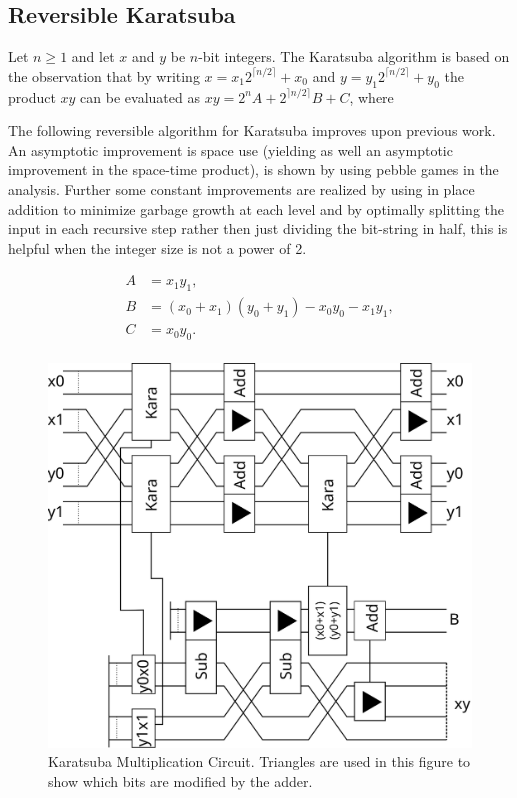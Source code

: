   \subsection{Reversible Karatsuba\label{sec:kara}}    
    Let $n\geq 1$ and let $x$ and $y$ be $n$-bit integers.  The
    Karatsuba\cite{KO:1963} algorithm is based on the observation that by
    writing $x=x_1 2^{\lceil n/2\rceil}+x_0$ and $y=y_1 2^{\lceil n/2\rceil
    }+y_0$ the product $xy$ can be evaluated as $xy=2^n A + 2^{\rceil n/2
    \rceil} B + C$, where

The following reversible algorithm for Karatsuba improves upon previous
work\cite{PF:2006,Kepley2015,offermann2010}. An asymptotic improvement is space
use (yielding as well an asymptotic improvement in the space-time product), is
shown by using pebble games in the analysis. Further some constant improvements
are realized by using in place addition to minimize garbage growth at each
level and by optimally splitting the input in each recursive step rather then
just dividing the bit-string in half, this is helpful when the integer size is
not a power of 2.

    \begin{align*}
      A &= x_1 y_1, \\
      B &= (x_0+x_1)(y_0+y_1) - x_0 y_0 - x_1 y_1,\\
      C &= x_0 y_0. \\
    \end{align*}
    \begin{figure}[ht]
      \capstart
      \centering
      \includegraphics[width=2\textwidth/3]{images/karatsuba2}
      \caption{Karatsuba Multiplication Circuit. Triangles are used in this figure to show which bits are modified by the adder.}
      \label{fig:kara2}
     \end{figure}

